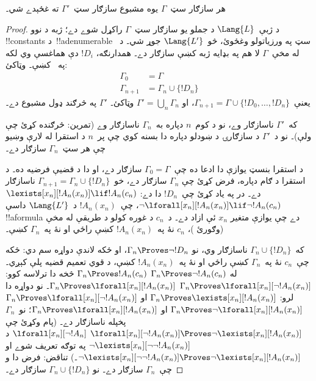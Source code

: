 \documentclass[../../../include/open-logic-section]{subfiles}
\begin{document}
\begin{lem}
هر سازګار سټ~$\Gamma$ يوه مشبوع سازګار سټ~$\Gamma'$ ته غځېدے
شي۔
\end{lem}

\begin{proof}
د ژبې~$\Lang{L}$ د جملو يو سازګار سټ~$\Gamma$ راکړل
شوے دے؛ ژبه د نوو !!{constant}s د~!!a{denumerable} سټ په
ورزياتولو وغځوئ، څو~$\Lang{L'}$ جوړ شي۔ د~
له مخې~$\Gamma$ لا هم په بډايه ژبه کښې سازګار دے۔ همدارنګه،
$!D_i$ دې هماغسې وي لکه په~ کښې۔ وټاکئ:
\begin{align*}
\Gamma_0 & = \Gamma \\
\Gamma_{n+1} & = \Gamma_n \cup \{!D_n \}
\end{align*}
يعنې~$\Gamma_{n+1} = \Gamma \cup \{ !D_0, \dots, !D_n \}$، او
$\Gamma' = \bigcup_{n} \Gamma_n$ وټاکئ۔ $\Gamma'$ په څرګند ډول
مشبوع دے۔

که~$\Gamma'$ ناسازګار وے، نو د کوم~$n$ دپاره به~$\Gamma_n$
ناسازګار وے (تمرين: څرګنده کړئ چې ولې)۔ نو د~$\Gamma'$ د سازګارۍ
د ښودلو دپاره دا بسنه کوي چې پر~$n$ د استقرا له لارې وښيو چې هر
سټ~$\Gamma_n$ سازګار دے۔

د استقرا بنسټ يوازې دا ادعا ده چې~$\Gamma_0 = \Gamma$ سازګار دے،
او دا د قضيې فرضيه ده۔ د استقرا د ګام دپاره، فرض کړئ چې
$\Gamma_{n}$ سازګار دے، خو~$\Gamma_{n+1} =
\Gamma_n \cup \{!D_n\}$ ناسازګار دے۔ در په ياد کړئ چې~$!D_n$ دا
دے:
{$\lexists[x_{n}][!A_{n}(x_n)] \lif !A_{n}(c_{n})$}
{$\lnot\lforall[x_{n}][!A_{n}(x_n)] \lif \lnot !A_{n}(c_{n})$}،
چې~$!A_n(x_n)$ د~$\Lang{L'}$ داسې !!a{formula} دے چې يوازې متغير
$x_n$ ئې ازاد دے۔ د~$c_n$ د غوره کولو د طريقې له مخې (وګورئ
)، $c_n$ نۀ په~$!A_n(x_n)$ کښې راځي او نۀ
په~$\Gamma_n$ کښې۔

که~$\Gamma_n \cup \{!D_n\}$ ناسازګار وي، نو
$\Gamma_n \Proves \lnot !D_n$، او ځکه لاندې دواړه سم دي:
ځکه چې~$c_n$ نۀ په~$\Gamma_n$ کښې راځي او نۀ په~$!A_n(x_n)$
کښې، د قوي تعميم قضيه
پلې کېږي۔ له 
{$\Gamma_n \Proves \lnot !A_n(c_n)$}
{$\Gamma_n \Proves !A_n(c_n)$}
څخه دا ترلاسه کوو:
{$\Gamma_n \Proves \lforall[x_n][\lnot !A_n(x_n)]$}
{$\Gamma_n \Proves \lforall[x_n][!A_n(x_n)]$}۔
نو دواړه دا لرو:
{$\Gamma_n \Proves \lexists[x_n][!A_n(x_n)]$ او
$\Gamma_n \Proves \lforall[x_n][\lnot !A_n(x_n)]$}
{$\Gamma_n \Proves \lnot\lforall[x_n][!A_n(x_n)]$ او
$\Gamma_n \Proves \lforall[x_n][!A_n(x_n)]$}؛
نو~$\Gamma_n$ پخپله ناسازګار دے۔
{(پام وکړئ چې
{$\lforall[x_n][\lnot !A_n(x_n)] \Proves
  \lnot\lexists[x_n][!A_n(x_n)]$}
{$\lforall[x_n][\lnot !A_n]$ د
  $\lnot\lexists[x_n][\lnot\lnot !A_n(x_n)]$ په توګه تعريف شوے او
  $\lnot\lexists[x_n][\lnot\lnot !A_n(x_n)] \Proves
  \lnot\lexists[x_n][!A_n(x_n)]$}۔)}{}
تناقض: فرض دا و چې~$\Gamma_n$ سازګار دے۔ نو
$\Gamma_n \cup \{ !D_n\}$ سازګار دے۔
\end{proof}
\end{document}

